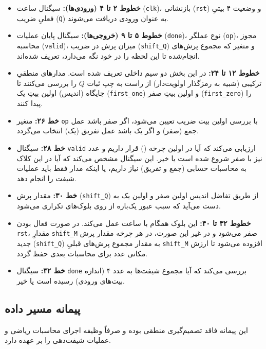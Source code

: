 \documentclass[11pt,a4paper]{article}
\begin{document}
\begin{itemize}
    \item \textbf{خطوط ۲ تا ۴ (ورودی‌ها):} سیگنال ساعت (\verb|clk|)، بازنشانی (\verb|rst|) و وضعیت ۴ بیتیِ فعلیِ ضریب (\verb|Q|) به عنوان ورودی دریافت می‌شوند.
    \item \textbf{خطوط ۵ تا ۹ (خروجی‌ها):} سیگنال پایان عملیات (\verb|done|)، نوع عملگر (\verb|op|)، مجوز محاسبه (\verb|valid|)، میزان پرش در ضریب (\verb|shift_Q|) و متغیر  که مجموع پرش‌های انجام‌شده تا این لحظه را در خود نگه می‌دارد، تعریف شده‌اند.
    \item \textbf{خطوط ۱۲ تا ۲۴:} در این بخش دو سیم داخلی تعریف شده است. مدارهای منطقیِ ترکیبی (شبیه به رمزگذار اولویت‌دار) از راست به چپ ثبات $Q$ را بررسی می‌کنند تا جایگاه (اندیس) اولین بیتِ یک (\verb|first_one|) و اولین بیتِ صفر (\verb|first_zero|) را پیدا کنند.
    \item \textbf{خط ۲۶:} متغیر \verb|op| با بررسی اولین بیت ضریب تعیین می‌شود، اگر صفر باشد عمل جمع (صفر) و اگر یک باشد عمل تفریق (یک) انتخاب می‌گردد.
    \item \textbf{خط ۲۸:} سیگنال \verb|valid| ارزیابی می‌کند که آیا در اولین چرخه () قرار داریم و عدد نیز با صفر شروع شده است یا خیر. این سیگنال مشخص می‌کند که آیا در این کلاک به محاسبات حسابی (جمع و تفریق) نیاز داریم، یا اینکه مدار فقط باید عملیات شیفت را انجام دهد.
    \item \textbf{خط ۳۰:} مقدار پرش (\verb|shift_Q|) از طریق تفاضل اندیس اولین صفر و اولین یک به دست می‌آید که سبب عبور یک‌باره از روی بلوک‌های تکراری می‌شود.
    \item \textbf{خطوط ۳۲ تا ۴۰:} این بلوک همگام با ساعت عمل می‌کند. در صورت فعال بودن \verb|rst|، مقدارِ \verb|shift_M| صفر می‌شود و در غیر این صورت، در هر چرخه مقدار پرش جدید (\verb|shift_Q|) به مقدار مجموع پرش‌های قبلیِ \verb|shift_M| افزوده می‌شود تا ارزش مکانی عدد برای محاسبات بعدی حفظ گردد.
    \item \textbf{خط ۴۲:} سیگنال \verb|done| بررسی می‌کند که آیا مجموع شیفت‌ها به عدد ۴ (اندازه بیت‌های ورودی) رسیده است یا خیر.
\end{itemize}

\subsection{پیمانه مسیر داده}
این پیمانه فاقد تصمیم‌گیری منطقی بوده و صرفاً وظیفه اجرای محاسبات ریاضی و عملیات شیفت‌دهی را بر عهده دارد.
\end{document}
